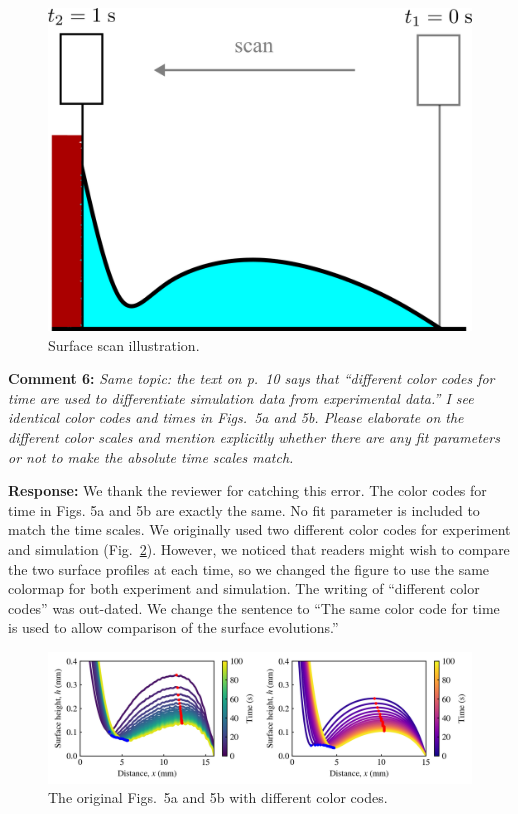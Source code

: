 \documentclass[11pt]{article}
\newif\ifhighlight
\newcommand{\hl}[1]{\ifhighlight\textcolor{blue}{#1}\else#1\fi}
\begin{document}
\begin{figure}[ht]
    \centering
    \includegraphics[width=0.4\linewidth]{illustrate_scan_time.png}
    \caption{Surface scan illustration.}
    \label{fig:first-scan}
\end{figure}

\bigskip
\begin{siderules}
\textbf{Comment 6:} \textit{Same topic: the text on p.~10 says that ``different color codes for time are used to differentiate simulation data from experimental data.'' I see identical color codes and times in Figs.~5a and 5b. Please elaborate on the different color scales and mention explicitly whether there are any fit parameters or not to make the absolute time scales match.}
\end{siderules}

\textbf{Response:} We thank the reviewer for catching this error. The color codes for time in Figs. 5a and 5b are exactly the same.
No fit parameter is included to match the time scales. We originally used two different color codes for experiment and simulation (Fig.~\ref{fig:different-color}). 
However, we noticed that readers might wish to compare the two surface profiles at each time, so we changed the figure to use the same colormap for both experiment and simulation. The writing of “different color codes” was out-dated. We change the sentence to \hl{``The same color code for time is used to allow comparison of the surface evolutions.''}

\begin{figure}[ht]
    \centering
    \includegraphics[width=0.9\linewidth]{different_color_codes.png}
    \caption{The original Figs.~5a and 5b with different color codes.}
    \label{fig:different-color}
\end{figure}
\end{document}
